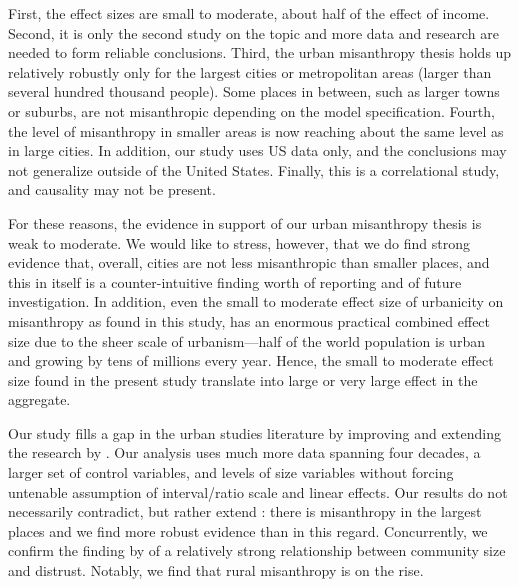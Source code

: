 \documentclass[11pt, letterpaper]{article}
\begin{document}
\begin{spacing}{1.4}
First, the effect sizes are small to moderate, about half of the
effect of income. Second, it is only the second study  \citep[after][]{wilson85} on the topic and more data and research are needed to form  reliable conclusions. Third, the urban
misanthropy thesis holds up relatively robustly only for the largest cities or metropolitan areas (larger than several hundred thousand people). Some places in between, such as larger towns or suburbs, are not misanthropic depending on the model specification. Fourth,
the level of misanthropy in smaller areas is now reaching about the same level
as in large cities. In addition, our study uses US data only, and the conclusions may not generalize outside of the United States. Finally, this is a correlational study, and causality may not be present. 
% 

For these reasons, the evidence in support of our urban misanthropy thesis is
 weak to moderate.  We would like to stress, however, that we do find strong evidence that,
 overall,  cities are not less misanthropic than smaller places, and this in
 itself is a counter-intuitive finding worth of reporting and of future investigation.
 In addition, even the small to moderate effect size of urbanicity on misanthropy
 as found in this study, has an enormous practical combined effect size due to the
 sheer scale of urbanism---half of the world population is urban and growing by tens
 of millions every year. Hence, the small to moderate effect size found in the
 present study translate into large or very large effect in the aggregate. 

Our study fills a gap in the urban studies literature by improving and extending the research by \citet{wilson85}. Our analysis uses much more data spanning four decades, a larger set of control variables, and levels of size variables without
forcing untenable assumption of interval/ratio scale and linear effects. Our
results do not necessarily contradict, but rather extend \citet{wilson85}: there
is misanthropy in the largest places %
and we find more robust evidence than \citet{wilson85} in this regard. Concurrently, we confirm the finding by \citet{fischer81} of a relatively strong relationship between community size and distrust. Notably, we find that rural misanthropy is on the rise.



\end{spacing}
\end{document}
